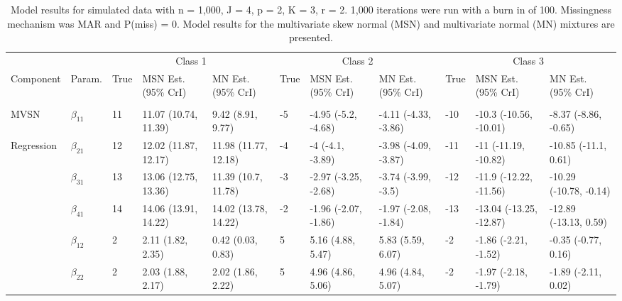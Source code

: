 \documentclass{article}
\begin{document}
\begin{landscape}\begin{table}[t]

\caption{\label{tab:unnamed-chunk-5}Model results for simulated data with n = 1,000, J = 4, p = 2, K = 3, r = 2. 1,000 iterations were run with a burn in of 100. Missingness mechanism was MAR and P(miss) = 0. Model results for the multivariate skew normal (MSN) and multivariate normal (MN) mixtures are presented.}
\centering
\fontsize{6}{8}\selectfont
\begin{tabular}{lllllllllll}
\toprule
\multicolumn{2}{c}{ } & \multicolumn{3}{c}{Class 1} & \multicolumn{3}{c}{Class 2} & \multicolumn{3}{c}{Class 3} \\
\cmidrule(l{3pt}r{3pt}){3-5} \cmidrule(l{3pt}r{3pt}){6-8} \cmidrule(l{3pt}r{3pt}){9-11}
Component & Param. & True & MSN Est. (95\% CrI) & MN Est. (95\% CrI)  & True & MSN Est. (95\% CrI) & MN Est. (95\% CrI) & True & MSN Est. (95\% CrI) & MN Est. (95\% CrI)\\
\midrule
\addlinespace[0.3em]
\multicolumn{11}{l}{\textbf{ }}\\
\hspace{1em}MVSN & $\beta_{11}$ & 11 & 11.07 (10.74, 11.39) & 9.42 (8.91, 9.77) & -5 & -4.95 (-5.2, -4.68) & -4.11 (-4.33, -3.86) & -10 & -10.3 (-10.56, -10.01) & -8.37 (-8.86, -0.65)\\
\hspace{1em}Regression & $\beta_{21}$ & 12 & 12.02 (11.87, 12.17) & 11.98 (11.77, 12.18) & -4 & -4 (-4.1, -3.89) & -3.98 (-4.09, -3.87) & -11 & -11 (-11.19, -10.82) & -10.85 (-11.1, 0.61)\\
\hspace{1em} & $\beta_{31}$ & 13 & 13.06 (12.75, 13.36) & 11.39 (10.7, 11.78) & -3 & -2.97 (-3.25, -2.68) & -3.74 (-3.99, -3.5) & -12 & -11.9 (-12.22, -11.56) & -10.29 (-10.78, -0.14)\\
\hspace{1em} & $\beta_{41}$ & 14 & 14.06 (13.91, 14.22) & 14.02 (13.78, 14.22) & -2 & -1.96 (-2.07, -1.86) & -1.97 (-2.08, -1.84) & -13 & -13.04 (-13.25, -12.87) & -12.89 (-13.13, 0.59)\\
\hspace{1em} & $\beta_{12}$ & 2 & 2.11 (1.82, 2.35) & 0.42 (0.03, 0.83) & 5 & 5.16 (4.88, 5.47) & 5.83 (5.59, 6.07) & -2 & -1.86 (-2.21, -1.52) & -0.35 (-0.77, 0.16)\\
\hspace{1em} & $\beta_{22}$ & 2 & 2.03 (1.88, 2.17) & 2.02 (1.86, 2.22) & 5 & 4.96 (4.86, 5.06) & 4.96 (4.84, 5.07) & -2 & -1.97 (-2.18, -1.79) & -1.89 (-2.11, 0.02)\\

\end{tabular}
\end{table}
\end{landscape}
\end{document}
